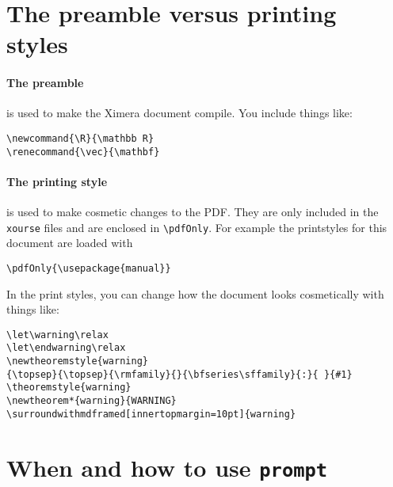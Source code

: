 \documentclass{ximera}
\begin{document}
\section{The preamble versus printing styles}

\paragraph{The preamble} is used to make the Ximera document compile. You include things like:
\begin{verbatim}
\newcommand{\R}{\mathbb R}
\renecommand{\vec}{\mathbf}
\end{verbatim}


\paragraph{The printing style} is used to make cosmetic changes to the PDF. They are only
included in the \verb!xourse! files and are enclosed in \verb!\pdfOnly!. For
example the printstyles for this document are loaded with
\begin{verbatim}
\pdfOnly{\usepackage{manual}}
\end{verbatim}
In the print styles, you can change how the document looks cosmetically with things like:
\begin{verbatim}
\let\warning\relax
\let\endwarning\relax
\newtheoremstyle{warning}
{\topsep}{\topsep}{\rmfamily}{}{\bfseries\sffamily}{:}{ }{#1}
\theoremstyle{warning}
\newtheorem*{warning}{WARNING}
\surroundwithmdframed[innertopmargin=10pt]{warning}
\end{verbatim}


\section{When and how to use \texttt{prompt}}
\end{document}
